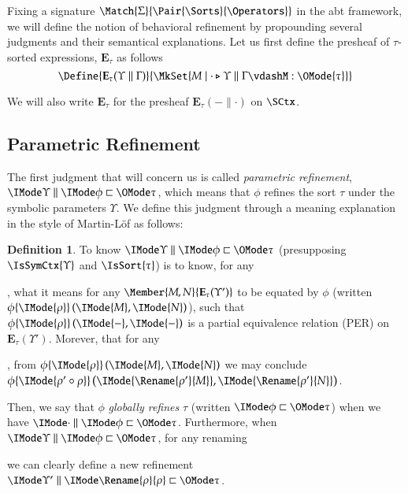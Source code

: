 \documentclass[11pt]{article}
\theoremstyle{definition}
\newtheorem{definition}[thm]{Definition}
\theoremstyle{notation}
\theoremstyle{remark}
\numberwithin{equation}{section}
\newcommand\IsAbtUnmoded[5]{
  #1\triangleright%
  #2\parallel%
  #3\vdash%
  #4:\OMode{#5}%
}
\newcommand\Exprs{\mathbf{E}}
\begin{document}
Fixing a signature $\Match{\Sigma}{\Pair{\Sorts}{\Operators}}$ in the abt
framework, we will define the notion of behavioral refinement by propounding
several judgments and their semantical explanations. Let us first define the
presheaf of $\tau$-sorted expressions, $\Exprs_\tau$ as follows
\[
  \Define{
    \Exprs_\tau(\Upsilon\parallel\Gamma)
  }{
    \MkSet{M \mid \IsAbtUnmoded{\cdot}{\Upsilon}{\Gamma}{M}{\tau}}
  }
\]

We will also write $\Exprs_\tau$ for the presheaf $\Exprs_\tau(-\parallel\cdot)$ on $\SCtx$.

\subsection{Parametric Refinement}

The first judgment that will concern us is called \emph{parametric refinement},
$\Refines{\Upsilon}{\phi}{\tau}$, which means that $\phi$ refines the sort
$\tau$ under the symbolic parameters $\Upsilon$. We define this judgment
through a meaning explanation in the style of Martin-L\"of as follows:

\newcommand\RefEquate[4]{#1\{\IMode{#2}\}\left(\IMode{#3},\IMode{#4}\right)}

\begin{definition}
  To know $\Refines{\Upsilon}{\phi}{\tau}$ (presupposing $\IsSymCtx{\Upsilon}$
  and $\IsSort{\tau}$) is to know, for any
, what it means for any $\Member{M,N}{\Exprs_\tau(\Upsilon')}$ to be equated by
  $\phi$ (written $\RefEquate{\phi}{\rho}{M}{N}$), such that
  $\RefEquate{\phi}{\rho}{-}{-}$ is a partial equivalence relation (PER) on
  $\Exprs_\tau(\Upsilon')$. Morever, that for any
,
  from $\RefEquate{\phi}{\rho}{M}{N}$ we may conclude
  $\RefEquate{\phi}{\rho'\circ\rho}{\Rename{\rho'}{M}}{\Rename{\rho'}{N}}$.
\end{definition}

Then, we say that $\phi$ \emph{globally refines} $\tau$ (written
$\GloballyRefines{\phi}{\tau}$) when we have $\Refines{\cdot}{\phi}{\tau}$.
Furthermore, when $\Refines{\Upsilon}{\phi}{\tau}$, for any renaming
we can clearly define a new refinement $\Refines{\Upsilon'}{\Rename{\rho}{\rho}}{\tau}$.
\end{document}

